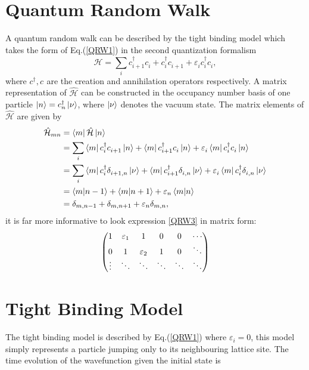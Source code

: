 \documentclass{article}
\numberwithin{equation}{section}
\renewcommand{\H}{\mathcal{\hat{H}}}
\newcommand{\1}{\mathbb{1}}
\newcommand{\annihilation}{c^{}}
\newcommand{\creation}{c^{\dagger}}
\begin{document}
\section{Quantum Random Walk}
A quantum random walk can be described by the tight binding model which takes the form of Eq.(\ref{QRW1}) in the second quantization formalism
\begin{equation}\label{QRW1}
    \H=\sum_{i}\creation_{i+1}\annihilation_i+\creation_{i}\annihilation_{i+1}+\varepsilon^{}_i\creation_i\annihilation_i,
\end{equation}
where $\creation,\annihilation$ are the creation and annihilation operators respectively.
A matrix representation of $\H$ can be constructed in the occupancy number basis of one particle $\ket{n}=\creation_n\ket{\nu}$, where $\ket{\nu}$ denotes the vacuum state. The matrix elements of $\H$ are given by
\begin{align}\label{QRW2}
    \H_{mn}&=\bra{m}\H\ket{n}
    \\
    &=\sum_i \bra{m}\creation_{i}\annihilation_{i+1}\ket{n} +\bra{m}\creation_{i+1}\annihilation_{i}\ket{n} + \varepsilon^{}_i\bra{m}\creation_{i}\annihilation_{i}\ket{n} 
    \\
    &= \sum_i \bra{m}\creation_{i}\delta^{}_{i+1,n}\ket{\nu}
    +\bra{m}\creation_{i+1}\delta^{}_{i,n}\ket{\nu} +
    \varepsilon^{}_i\bra{m}\creation_{i}\delta^{}_{i,n}\ket{\nu} 
    \\
    &= \bra{m}\ket{n-1}+\bra{m}\ket{n+1}+\varepsilon_n\bra{m}\ket{n}
    \\
    &=\delta_{m,n-1}+\delta_{m,n+1}+\varepsilon_n\delta_{m,n}, \label{QRW3}
\end{align}
it is far more informative to look expression \ref{QRW3} in matrix form:
\begin{equation}
    \mqty(
    1 & \varepsilon_1 & 1 & 0 & 0 &\cdots 
    \\
    0 & 1 & \varepsilon_2 & 1 & 0&\ddots
    \\
    \vdots & \ddots & \ddots & \ddots  & \ddots &\ddots
    )
\end{equation}
\section{Tight Binding Model}
The tight binding model is described by Eq.(\ref{QRW1}) where $\varepsilon_i=0$, this model simply represents a particle jumping only to its neighbouring lattice site. The time evolution of the wavefunction given the initial state is 
\end{document}
